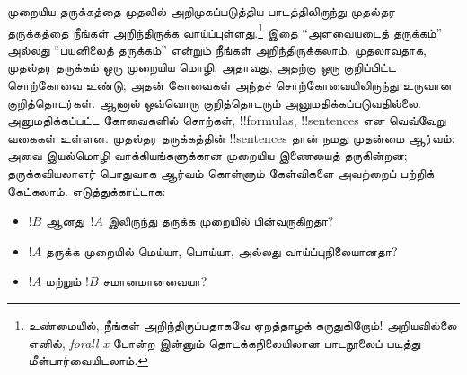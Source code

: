 \documentclass[../../../include/open-logic-section]{subfiles}
\begin{document}


முறையிய தருக்கத்தை முதலில் அறிமுகப்படுத்திய பாடத்திலிருந்து முதல்தர தருக்கத்தை
நீங்கள் அறிந்திருக்க வாய்ப்புள்ளது.\footnote{உண்மையில், நீங்கள் அறிந்திருப்பதாகவே
ஏறத்தாழக் கருதுகிறோம்!{} அறியவில்லை எனில், \emph{forall x}
\citep{Magnus2021} போன்ற இன்னும் தொடக்கநிலையிலான பாடநூலைப் படித்து
மீள்பார்வையிடலாம்.} இதை ``அளவையடைத் தருக்கம்'' அல்லது ``பயனிலைத் தருக்கம்''
என்றும் நீங்கள் அறிந்திருக்கலாம். முதலாவதாக, முதல்தர தருக்கம் ஒரு முறையிய
மொழி. அதாவது, அதற்கு ஒரு குறிப்பிட்ட சொற்கோவை உண்டு; அதன் கோவைகள் அந்தச்
சொற்கோவையிலிருந்து உருவான குறித்தொடர்கள். ஆனால் ஒவ்வொரு குறித்தொடரும்
அனுமதிக்கப்படுவதில்லை. அனுமதிக்கப்பட்ட கோவைகளில் சொற்கள், !!{formula}s,
!!{sentence}s என வெவ்வேறு வகைகள் உள்ளன. முதல்தர தருக்கத்தின் !!{sentence}s
தான் நமது முதன்மை ஆர்வம்: அவை இயல்மொழி வாக்கியங்களுக்கான முறையிய இணையைத்
தருகின்றன; தருக்கவியலாளர் பொதுவாக ஆர்வம் கொள்ளும் கேள்விகளை அவற்றைப் பற்றிக்
கேட்கலாம். எடுத்துக்காட்டாக:

\begin{itemize}
    \item $!B$ ஆனது~$!A$ இலிருந்து தருக்க முறையில் பின்வருகிறதா?
    \item $!A$ தருக்க முறையில் மெய்யா, பொய்யா, அல்லது
    வாய்ப்புநிலையானதா?
    \item $!A$ மற்றும் $!B$ சமானமானவையா?
\end{itemize}
\end{document}
